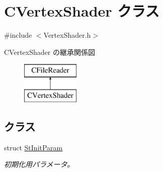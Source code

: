 \hypertarget{class_c_vertex_shader}{}\section{C\+Vertex\+Shader クラス}
\label{class_c_vertex_shader}


{\ttfamily \#include $<$Vertex\+Shader.\+h$>$}

C\+Vertex\+Shader の継承関係図\begin{figure}[H]
\begin{center}
\leavevmode
\includegraphics[height=2.000000cm]{class_c_vertex_shader}
\end{center}
\end{figure}
\subsection*{クラス}
\begin{DoxyCompactItemize}
\item 
struct \hyperlink{struct_c_vertex_shader_1_1_st_init_param}{St\+Init\+Param}
\begin{DoxyCompactList}\small\item\em 初期化用パラメータ。 \end{DoxyCompactList}\end{DoxyCompactItemize}
